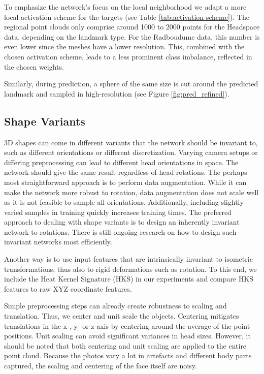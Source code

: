 \documentclass[class=article, crop=false]{standalone}
\begin{document}
To emphasize the network's focus on the local neighborhood we adapt a more local activation scheme for the targets (see Table \ref{tab:activation-scheme}). The regional point clouds only comprise around 1000 to 2000 points for the Headspace data, depending on the landmark type. For the Radboudumc data, this number is even lower since the meshes have a lower resolution. This, combined with the chosen activation scheme, leads to a less prominent class imbalance, reflected in the chosen weights.

Similarly, during prediction, a sphere of the same size is cut around the predicted landmark and sampled in high-resolution (see Figure \ref{fig:pred_refined}).


\subsection{Shape Variants}
3D shapes can come in different variants that the network should be invariant to, such as different orientations or different discretization. Varying camera setups or differing preprocessing can lead to different head orientations in space. The network should give the same result regardless of head rotations. The perhaps most straightforward approach is to perform data augmentation. While it can make the network more robust to rotation, data augmentation does not scale well as it is not feasible to sample all orientations. Additionally, including slightly varied samples in training quickly increases training times. The preferred approach to dealing with shape variants is to design an inherently invariant network to rotations. There is still ongoing research on how to design such invariant networks most efficiently. 

Another way is to use input features that are intrinsically invariant to isometric transformations, thus also to rigid deformations such as rotation. To this end, we include the Heat Kernel Signature (HKS) in our experiments and compare HKS features to raw XYZ coordinate features.

Simple preprocessing steps can already create robustness to scaling and translation. Thus, we center and unit scale the objects. Centering mitigates translations in the x-, y- or z-axis by centering around the average of the point positions. Unit scaling can avoid significant variances in head sizes. However, it should be noted that both centering and unit scaling are applied to the entire point cloud. Because the photos vary a lot in artefacts and different body parts captured, the scaling and centering of the face itself are noisy.
\end{document}

